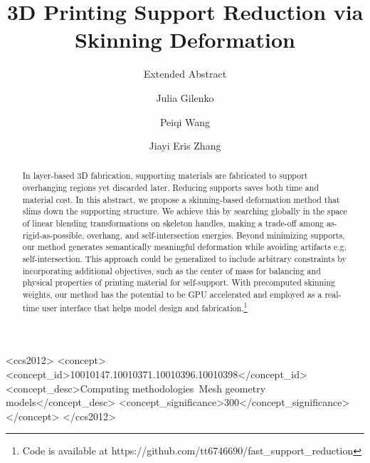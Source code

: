 \documentclass[sigconf]{acmart}
\begin{document}
\title{3D Printing Support Reduction via Skinning Deformation}
\subtitle{Extended Abstract}

\author{Julia Gilenko}

\author{Peiqi Wang}

\author{Jiayi Eris Zhang}

\renewcommand{\shortauthors}{Julia G. Mark W. Eris Z.}

\begin{abstract}
 
In layer-based 3D fabrication, supporting materials are fabricated to support overhanging regions yet discarded later. Reducing supports saves both time and material cost. In this abstract, we propose a skinning-based deformation method that slims down the supporting structure. We achieve this by searching globally in the space of linear blending transformations on skeleton handles, making a trade-off among as-rigid-as-possible, overhang, and self-intersection energies. Beyond minimizing supports, our method generates semantically meaningful deformation while avoiding artifacts e.g. self-intersection. This approach could be generalized to include arbitrary constraints by incorporating additional objectives, such as the center of mass for balancing and physical properties of printing material for self-support. With precomputed skinning weights, our method has the potential to be GPU accelerated and employed as a real-time user interface that helps model design and fabrication.\footnote{Code is available at https://github.com/tt6746690/fast\_support\_reduction}
\end{abstract}

%
%
\begin{CCSXML}
    <ccs2012>
    <concept>
    <concept_id>10010147.10010371.10010396.10010398</concept_id>
    <concept_desc>Computing methodologies~Mesh geometry models</concept_desc>
    <concept_significance>300</concept_significance>
    </concept>
    </ccs2012>
\end{CCSXML}

\end{document}
